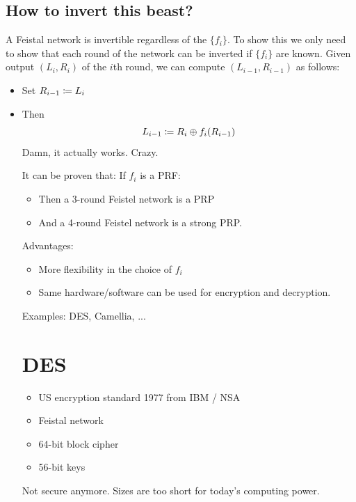 \documentclass[12pt]{article}
\begin{document}
\subsection{How to invert this beast?}
A Feistal network is invertible regardless of the $\{f_i\}$. To show this we only need to show that each round of the network can be inverted if $\{f_i\}$ are known. Given output $(L_i,R_i)$ of the $i$th round, we can compute $(L_{i-1},R_{i-1})$ as follows:
\begin{itemize}
\item Set $R_{i-1}\coloneqq L_i$
\item Then
\begin{equation*}
L_{i-1} \coloneqq R_i \oplus f_i(R_{i-1})
\end{equation*}
Damn, it actually works. Crazy.

It can be proven that: If $f_i$ is a PRF:
\begin{itemize}
\item Then a 3-round Feistel network is a PRP
\item And a 4-round Feistel network is a strong PRP.
\end{itemize}

Advantages:
\begin{itemize}
\item More flexibility in the choice of $f_i$
\item Same hardware/software can be used for encryption and decryption.
\end{itemize}

Examples: DES, Camellia, ...

\section{DES}
\begin{itemize}
\item US encryption standard 1977 from IBM / NSA
\item Feistal network
\item 64-bit block cipher
\item 56-bit keys
\end{itemize}
Not secure anymore. Sizes are too short for today's computing power.


\end{itemize}
\end{document}
